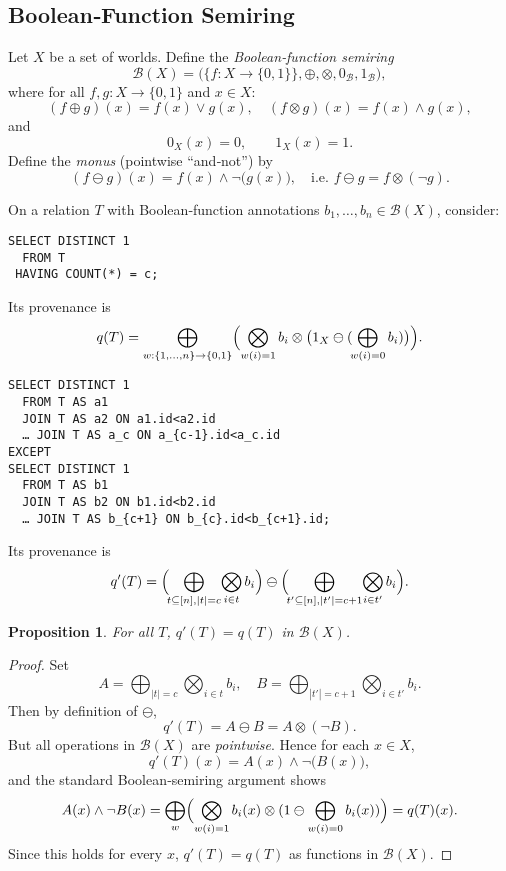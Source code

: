 \documentclass{article}
\newtheorem{proposition}{Proposition}
\begin{document}
\subsection*{Boolean‐Function Semiring}

Let \(X\) be a set of worlds.  Define the \emph{Boolean‐function semiring}
\[
  \mathcal{B}(X)
  = \bigl(\{f : X \to \{0,1\}\},\oplus,\otimes,0_{\mathcal{B}},1_{\mathcal{B}}\bigr),
\]
where for all \(f,g: X\to\{0,1\}\) and \(x\in X\):
\[
  (f\oplus g)(x) = f(x)\vee g(x),
  \quad
  (f\otimes g)(x) = f(x)\wedge g(x),
\]
and
\[
  0_X(x)=0,\qquad 1_X(x)=1.
\]
Define the \emph{monus} (pointwise ``and‐not'') by
\[
  (f\ominus g)(x)
  = f(x)\wedge\neg\bigl(g(x)\bigr),
  \quad
  \text{i.e.\ }f\ominus g = f\otimes(\neg g).
\]

\medskip
On a relation \(T\) with Boolean‐function annotations \(b_1,\dots,b_n\in\mathcal{B}(X)\), consider:

\begin{verbatim}
SELECT DISTINCT 1
  FROM T
 HAVING COUNT(*) = c;
\end{verbatim}

Its provenance is
\[
  q(T)
  = \bigoplus_{w:\{1,\dots,n\}\to\{0,1\}}
    \Bigl(\bigotimes_{w(i)=1}b_i
           \otimes
           \bigl(1_X\ominus(\!\bigoplus_{w(i)=0}b_i)\bigr)
    \Bigr).
\]

\begin{verbatim}
SELECT DISTINCT 1
  FROM T AS a1
  JOIN T AS a2 ON a1.id<a2.id 
  … JOIN T AS a_c ON a_{c-1}.id<a_c.id
EXCEPT
SELECT DISTINCT 1
  FROM T AS b1
  JOIN T AS b2 ON b1.id<b2.id 
  … JOIN T AS b_{c+1} ON b_{c}.id<b_{c+1}.id;
\end{verbatim}

Its provenance is
\[
  q'(T)
  = \Bigl(\!\bigoplus_{t\subseteq[n],|t|=c}\!\bigotimes_{i\in t}b_i\Bigr)
    \ominus
    \Bigl(\!\bigoplus_{t'\subseteq[n],|t'|=c+1}\!\bigotimes_{i\in t'}b_i\Bigr).
\]

\begin{proposition}
For all \(T\), \(q'(T)=q(T)\) in \(\mathcal{B}(X)\).
\end{proposition}

\begin{proof}
Set
\[
  A = \bigoplus_{|t|=c}\bigotimes_{i\in t}b_i,
  \quad
  B = \bigoplus_{|t'|=c+1}\bigotimes_{i\in t'}b_i.
\]
Then by definition of \(\ominus\),
\[
  q'(T) = A \ominus B = A \otimes (\neg B).
\]
But all operations in \(\mathcal{B}(X)\) are \emph{pointwise}.  Hence for each \(x\in X\),
\[
  q'(T)(x)
  = A(x)\wedge\neg\bigl(B(x)\bigr),
\]
and the standard Boolean‐semiring argument shows
\[
  A(x)\wedge\neg B(x)
  = \bigoplus_{w}\Bigl(\bigotimes_{w(i)=1}b_i(x)
                      \otimes
                      (1\ominus\bigoplus_{w(i)=0}b_i(x))\Bigr)
  = q(T)(x).
\]
Since this holds for every \(x\), \(q'(T)=q(T)\) as functions in \(\mathcal{B}(X)\).
\end{proof}
\end{document}
